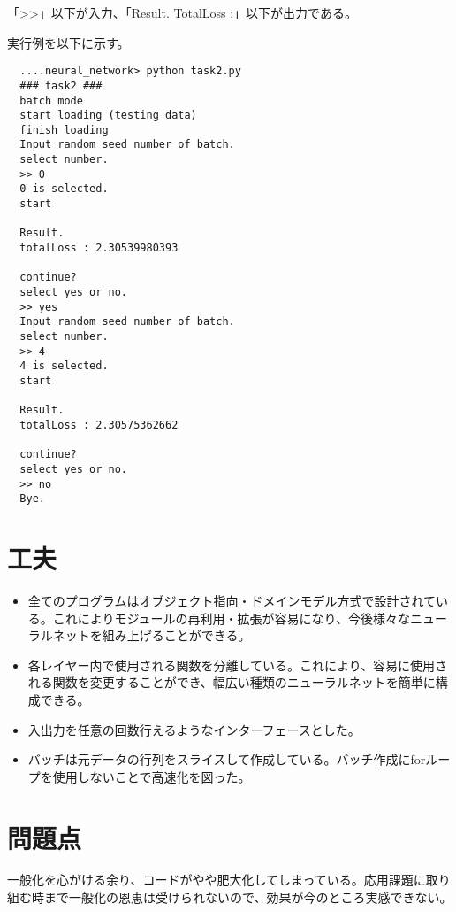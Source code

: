 \documentclass{ujarticle} %
\begin{document}
「\textgreater\textgreater」以下が入力、「Result. TotalLoss :」以下が出力である。

実行例を以下に示す。

\begin{verbatim}
  ....neural_network> python task2.py
  ### task2 ###
  batch mode
  start loading (testing data)
  finish loading
  Input random seed number of batch.
  select number.
  >> 0
  0 is selected.
  start

  Result.
  totalLoss : 2.30539980393

  continue?
  select yes or no.
  >> yes
  Input random seed number of batch.
  select number.
  >> 4
  4 is selected.
  start

  Result.
  totalLoss : 2.30575362662

  continue?
  select yes or no.
  >> no
  Bye.
\end{verbatim}

\section{工夫}
\begin{itemize}
  \item 全てのプログラムはオブジェクト指向・ドメインモデル方式で設計されている。これによりモジュールの再利用・拡張が容易になり、今後様々なニューラルネットを組み上げることができる。
  \item 各レイヤー内で使用される関数を分離している。これにより、容易に使用される関数を変更することができ、幅広い種類のニューラルネットを簡単に構成できる。
  \item 入出力を任意の回数行えるようなインターフェースとした。
  \item バッチは元データの行列をスライスして作成している。バッチ作成にforループを使用しないことで高速化を図った。
\end{itemize}

\section{問題点}
一般化を心がける余り、コードがやや肥大化してしまっている。応用課題に取り組む時まで一般化の恩恵は受けられないので、効果が今のところ実感できない。
\end{document}
